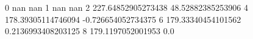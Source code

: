 0 nan nan
1 nan nan
2 227.64852905273438 48.52882385253906
4 178.39305114746094 -0.726654052734375
6 179.33340454101562 0.2136993408203125
8 179.1197052001953 0.0
